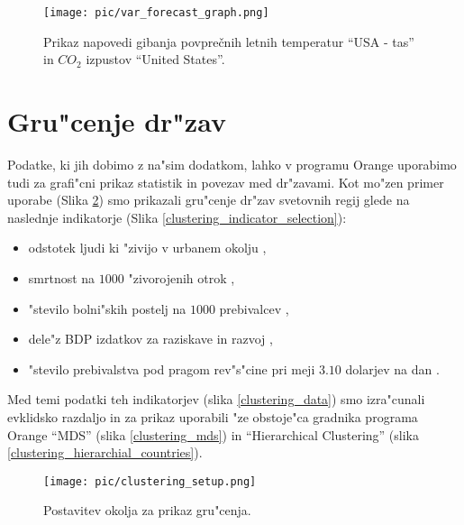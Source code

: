 \begin{figure}[H]
\begin{center}
\texttt{[image: pic/var\_forecast\_graph.png]}
\end{center}
\caption{Prikaz napovedi gibanja povprečnih letnih temperatur ``USA - tas'' in
  $CO_2$ izpustov ``United States''.}
\label{var_forecast_graph}
\end{figure} 


\section{Gru"cenje dr"zav}


Podatke, ki jih dobimo z na"sim dodatkom, lahko v programu Orange uporabimo tudi
za grafi"cni prikaz statistik in povezav med dr"zavami. Kot mo"zen primer
uporabe (Slika \ref{clustering_setup}) smo prikazali gru"cenje dr"zav svetovnih regij glede na naslednje
indikatorje (Slika \ref{clustering_indicator_selection}):
\begin{itemize}
  \item odstotek ljudi ki "zivijo v urbanem okolju 
    ,
  \item smrtnost na $1000$ "zivorojenih otrok
    ,
  \item "stevilo bolni"skih postelj na $1000$ prebivalcev
    ,
  \item dele"z BDP izdatkov za raziskave in razvoj
    ,
  \item "stevilo prebivalstva pod pragom rev"s"cine pri meji $3.10$ dolarjev na dan
    .
\end{itemize}
Med temi podatki teh indikatorjev (slika \ref{clustering_data}) smo izra"cunali evklidsko razdaljo in za prikaz 
uporabili "ze obstoje"ca gradnika programa Orange
``MDS'' (slika \ref{clustering_mds}) in
``Hierarchical Clustering'' (slika \ref{clustering_hierarchial_countries}).




\begin{figure}
\begin{center}
\texttt{[image: pic/clustering\_setup.png]}
\end{center}
\caption{Postavitev okolja za prikaz gru"cenja.}
\label{clustering_setup}
\end{figure} 

